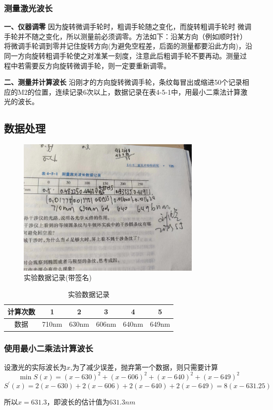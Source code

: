 \documentclass[12pt,a4paper,UTF8]{ctexart}
\begin{document}
\subsubsection*{测量激光波长}
\par \textbf{一、仪器调零} \quad 因为旋转微调手轮时，粗调手轮随之变化，而旋转粗调手轮时
微调手轮并不随之变化，所以测量前必须调零。方法如下：沿某方向（例如顺时针）
将微调手轮调到零并记住旋转方向(为避免空程差，后面的测量都要沿此方向)，沿
同一方向旋转粗调手轮使之对准某一刻度，注意此后粗调手轮不要再动。测量过
程中若需要反方向旋转微调手轮，则一定要重新调零。
\par \textbf{二、测量并计算波长} \quad 沿刚才的方向旋转微调手轮，条纹每冒出或缩进50个记录相应的M2的位置，连续记录6次以上，数据记录在表4-5-1中，用最小二乘法计算激光的波长。
\clearpage
\subsection*{数据处理}
\begin{figure}[!htbp]
	\centering
	\includegraphics[width=0.8\textwidth]{实验数据.jpg}
	\caption{实验数据记录(带签名)}
\end{figure}
\begin{table}[!htbp]
	\centering
	\begin{tabular}{|c|c|c|c|c|c|}
		\hline
		计算次数 & 1 & 2 & 3 & 4 & 5 \\
		\hline
		数据 & 710nm & 630nm & 606nm & 640nm & 649nm \\
		\hline
		\end{tabular}
	\caption{实验数据记录}
		
\end{table}

\subsubsection*{使用最小二乘法计算波长}
\par 设激光的实际波长为$x$,为了减少误差，抛弃第一个数据，则只需要计算
\[
	\min{S(x) = (x-630)^2 + (x-606)^2 + (x-640)^2 + (x-649)^2} 
\]
\[
	S^{\prime}(x) = 2(x-630) + 2(x-606) + 2(x-640) + 2(x-649) = 8(x-631.25)
\]
\par 所以$x = 631.3$，即波长的估计值为$631.3nm$
\end{document}
